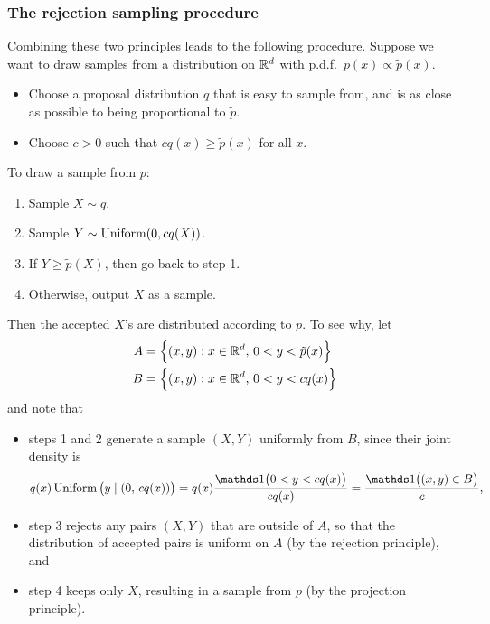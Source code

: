 \documentclass[12pt]{article}
\begin{document}
\subsubsection{The rejection sampling procedure}
Combining these two principles leads to the following procedure. Suppose we want to draw samples from a distribution on $\mathbb{R}^d$ with p.d.f.\ $p(x) \propto \tilde p(x)$.
\begin{itemize}
\item Choose a proposal distribution $q$ that is easy to sample from, and is as close as possible to being proportional to $\tilde p$.
\item Choose $c>0$ such that $ c q(x)\geq \tilde p(x)$ for all $x$.
\end{itemize}
To draw a sample from $p$:
\begin{enumerate}
\item Sample $X\sim q$.
\item Sample $Y\sim\operatorname*{Uniform}(0,c q(X))$.
\item If $Y \geq \tilde p(X)$, then go back to step 1.
\item Otherwise, output $X$ as a sample.
\end{enumerate}
Then the accepted $X$'s are distributed according to $p$. To see why, let
\begin{align*}
A &= \Big\{(x,y): x\in\mathbb{R}^d,\,0<y<\tilde p(x)\Big\}\\
B &= \Big\{(x,y): x\in\mathbb{R}^d,\,0<y<c q(x)\Big\}
\end{align*}
and note that
\begin{itemize}
\item steps 1 and 2 generate a sample $(X,Y)$ uniformly from $B$, since their joint density is
    $$q(x)\Uniform\big(y\mid (0,\,c q(x))\big) = q(x) \frac{\I\big(0<y<c q(x)\big)}{c q(x)} = \frac{\I\big((x,y)\in B\big)}{c},$$
\item step 3 rejects any pairs $(X,Y)$ that are outside of $A$, so that the distribution of accepted pairs is uniform on $A$ (by the rejection principle), and
\item step 4 keeps only $X$, resulting in a sample from $p$ (by the projection principle).
\end{itemize}




\end{document}
